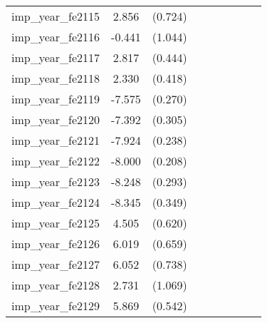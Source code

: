 {\begin{tabular}{l*{4}{cc}}
imp\_year\_fe2115&    2.856\sym{***}&  (0.724)&                  &         &                  &         &                  &         \\
imp\_year\_fe2116&   -0.441         &  (1.044)&                  &         &                  &         &                  &         \\
imp\_year\_fe2117&    2.817\sym{***}&  (0.444)&                  &         &                  &         &                  &         \\
imp\_year\_fe2118&    2.330\sym{***}&  (0.418)&                  &         &                  &         &                  &         \\
imp\_year\_fe2119&   -7.575\sym{***}&  (0.270)&                  &         &                  &         &                  &         \\
imp\_year\_fe2120&   -7.392\sym{***}&  (0.305)&                  &         &                  &         &                  &         \\
imp\_year\_fe2121&   -7.924\sym{***}&  (0.238)&                  &         &                  &         &                  &         \\
imp\_year\_fe2122&   -8.000\sym{***}&  (0.208)&                  &         &                  &         &                  &         \\
imp\_year\_fe2123&   -8.248\sym{***}&  (0.293)&                  &         &                  &         &                  &         \\
imp\_year\_fe2124&   -8.345\sym{***}&  (0.349)&                  &         &                  &         &                  &         \\
imp\_year\_fe2125&    4.505\sym{***}&  (0.620)&                  &         &                  &         &                  &         \\
imp\_year\_fe2126&    6.019\sym{***}&  (0.659)&                  &         &                  &         &                  &         \\
imp\_year\_fe2127&    6.052\sym{***}&  (0.738)&                  &         &                  &         &                  &         \\
imp\_year\_fe2128&    2.731\sym{*}  &  (1.069)&                  &         &                  &         &                  &         \\
imp\_year\_fe2129&    5.869\sym{***}&  (0.542)&                  &         &                  &         &                  &         \\

\end{tabular}}

